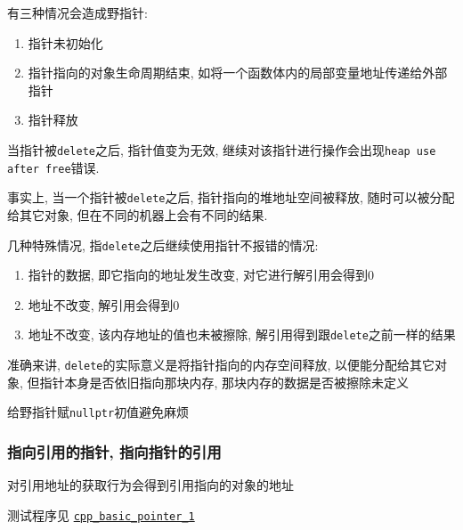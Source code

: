 有三种情况会造成野指针:
\begin{enumerate}
	\item 指针未初始化
	\item 指针指向的对象生命周期结束, 如将一个函数体内的局部变量地址传递给外部指针
	\item 指针释放
\end{enumerate}

当指针被{\tt delete}之后, 指针值变为无效, 继续对该指针进行操作会出现{\tt heap use after free}错误.

事实上, 当一个指针被{\tt delete}之后, 指针指向的堆地址空间被释放, 随时可以被分配给其它对象, 但在不同的机器上会有不同的结果.

\noindent 几种特殊情况, 指{\tt delete}之后继续使用指针不报错的情况:
\begin{enumerate}
	\item 指针的数据, 即它指向的地址发生改变, 对它进行解引用会得到0
	\item 地址不改变, 解引用会得到0
	\item 地址不改变, 该内存地址的值也未被擦除, 解引用得到跟{\tt delete}之前一样的结果
\end{enumerate}

准确来讲, {\tt delete}的实际意义是将指针指向的内存空间释放, 以便能分配给其它对象, 但指针本身是否依旧指向那块内存, 
	那块内存的数据是否被擦除未定义

给野指针赋{\tt nullptr}初值避免麻烦

\subsubsection{指向引用的指针, 指向指针的引用}
对引用地址的获取行为会得到引用指向的对象的地址

测试程序见 \href{https://github.com/wenqingqian/Obtuse/tree/main/test/cpp/basic/pointer_1}{\tt cpp\_basic\_pointer\_1}


\subsection{}
\subsection{}
